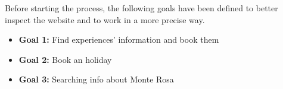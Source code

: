 Before starting the process, the following goals have been defined to better inspect the website and to work in a more precise way.
\begin{itemize}
	\item \textbf{Goal 1:} Find experiences' information and book them
	\item \textbf{Goal 2:} Book an holiday
	\item \textbf{Goal 3:} Searching info about Monte Rosa

\end{itemize}